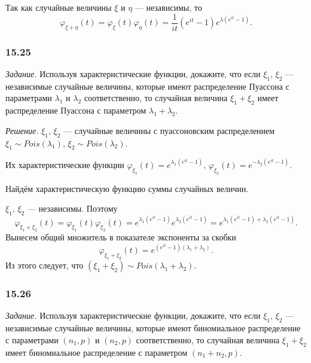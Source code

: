 Так как случайные величины $ \xi $ и $ \eta $ --- независимы, то
$$ \varphi_{ \xi + \eta } \left( t \right) =
  \varphi_{ \xi } \left( t \right) \varphi_{ \eta } \left( t \right) =
  \frac{1}{it} \left( e^{it} - 1 \right) e^{ \lambda \left( e^{it} - 1 \right) }.$$

\subsubsection*{15.25}

\textit{Задание.}
Используя характеристические функции, докажите, что если $ \xi_1, \, \xi_2$ ---
независимые случайные величины,
которые имеют распределение Пуассона с параметрами $ \lambda_1$ и $ \lambda_2$ соответственно,
то случайная величина $ \xi_1 + \xi_2$ имеет распределение Пуассона с параметром
$ \lambda_1 + \lambda_2$.

\textit{Решение.}
$ \xi_1, \, \xi_2$ ---
случайные величины с пуассоновским распределением
$ \xi_1 \sim Pois \left( \lambda_1 \right), \,
  \xi_2 \sim Pois \left( \lambda_2 \right) $.

Их характеристические функции
$ \varphi_{ \xi_1} \left( t \right) = e^{ \lambda_1 \left( e^{it} - 1 \right) }, \,
  \varphi_{ \xi_2} \left( t \right) = e^{- \lambda_2 \left( e^{it} - 1 \right) }$.

Найдём характеристическую функцию суммы случайных величин.

$ \xi_1, \, \xi_2$ --- независимы.
Поэтому
$$ \varphi_{ \xi_1 + \xi_2} \left( t \right) =
  \varphi_{ \xi_1} \left( t \right) \varphi_{ \xi_2} \left( t \right) =
  e^{ \lambda_1 \left( e^{it} - 1 \right) } e^{ \lambda_2 \left( e^{it} - 1 \right) } =
  e^{ \lambda_1 \left( e^{it} - 1 \right) + \lambda_2 \left( e^{it} - 1 \right) }.$$
Вынесем общий множитель в показателе экспоненты за скобки
$$ \varphi_{ \xi_1 + \xi_2} \left( t \right) =
  e^{ \left( e^{it} - 1 \right) \left( \lambda_1 + \lambda_2 \right) }.$$
Из этого следует,
что $ \left( \xi_1 + \xi_2 \right) \sim Pois \left( \lambda_1 + \lambda_2 \right) $.

\subsubsection*{15.26}

\textit{Задание.}
Используя характеристические функции, докажите, что если $ \xi_1, \, \xi_2$ ---
независимые случайные величины,
которые имеют биномиальное распределение с параметрами $ \left( n_1, p \right) $ и
$ \left( n_2, p \right) $ соответственно,
то случайная величина $ \xi_1 + \xi_2$ имеет биномиальное распределение с параметром
$ \left( n_1 + n_2, p \right) $.

